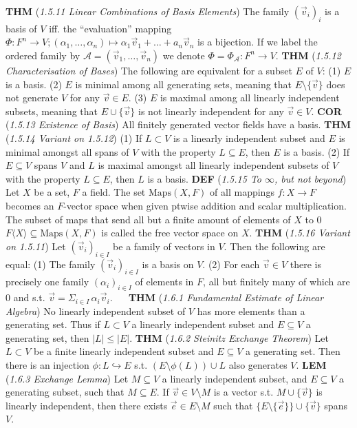 \documentclass{article}
\newcommand{\wde}[1]{\textcolor{defc}{\textbf{DEF}} (\textcolor{namec}{\textit{#1}})}
\newcommand{\wl}[1]{\textcolor{lemc}{\textbf{LEM}} (\textcolor{namec}{\textit{#1}})}
\newcommand{\wc}[1]{\textcolor{corc}{\textbf{COR}} (\textcolor{namec}{\textit{#1}})}
\newcommand{\wt}[1]{\textcolor{thmc}{\textbf{THM}} (\textcolor{namec}{\textit{#1}})}
\newcommand{\Maps}[0]{\text{Maps}}
\begin{document}
\begin{multicols}{2}
  \wt{1.5.11 Linear Combinations of Basis Elements} The family $(\vec{v}_{i})_{i}$ is a basis of $V$ iff. the ``evaluation'' mapping $\Phi : F^{n} \to V; (\alpha_{1}, \dots, \alpha_{n}) \mapsto \alpha_{1}\vec{v}_{1} + \dots + a_{n}\vec{v}_{n}$ is a bijection. If we label the ordered family by $\mathcal{A} = (\vec{v}_{1}, \dots, \vec{v}_{n})$ we denote $\Phi = \Phi_{\mathcal{A}} : F^{n} \to V$.
  \wt{1.5.12 Characterisation of Bases} The following are equivalent for a subset $E$ of $V$:
  (1) $E$ is a basis.
  (2) $E$ is minimal among all generating sets, meaning that $E \setminus \{\vec{v}\}$ does not generate $V$ for any $\vec{v} \in E$.
  (3) $E$ is maximal among all linearly independent subsets, meaning that $E \cup \{\vec{v}\}$ is not linearly independent for any $\vec{v} \in V$.
  \wc{1.5.13 Existence of Basis} All finitely generated vector fields have a basis.
  \wt{1.5.14 Variant on 1.5.12}
  (1) If $L \subset V$ is a linearly independent subset and $E$ is minimal amongst all spans of $V$ with the property $L \subseteq E$, then $E$ is a basis.
  (2) If $E \subseteq V$ spans $V$ and $L$ is maximal amongst all linearly independent subsets of $V$ with the property $L \subseteq E$, then $L$ is a basis.
  \wde{1.5.15 To $\infty$, but not beyond} Let $X$ be a set, $F$ a field. The set $\Maps(X,F)$ of all mappings $f : X \to F$ becomes an $F$-vector space when given ptwise addition and scalar multiplication. The subset of maps that send all but a finite amount of elements of $X$ to 0 $F \langle X \rangle \subseteq \Maps(X, F)$ is called the free vector space on $X$.
  \wt{1.5.16 Variant on 1.5.11} Let $(\vec{v}_{i})_{i \in I}$ be a family of vectors in $V$. Then the following are equal:
  (1) The family $(\vec{v}_{i})_{i \in I}$ is a basis on $V$.
  (2) For each $\vec{v} \in V$ there is precisely one family $(\alpha_{i})_{i \in I}$ of elements in $F$, all but finitely many of which are 0 and s.t. $\vec{v} = \Sigma_{i \in I} \, \alpha_{i}\vec{v}_{i}$.
\ \
  \wt{1.6.1 Fundamental Estimate of Linear Algebra} No linearly independent subset of $V$ has more elements than a generating set. Thus if $L \subset V$ a linearly independent subset and $E \subseteq V$ a generating set, then $|L| \le |E|$.
  \wt{1.6.2 Steinitz Exchange Theorem} Let $L \subset V$ be a finite linearly independent subset and $E \subseteq V$ a generating set. Then there is an injection $\phi : L \hookrightarrow E$ s.t. $(E \setminus \phi(L)) \cup L$ also generates $V$.
  \wl{1.6.3 Exchange Lemma} Let $M \subseteq V$ a linearly independent subset, and $E \subseteq V$ a generating subset, such that $M \subseteq E$. If $\vec{v} \in V \setminus M$ is a vector s.t. $M \cup \{\vec{v}\}$ is linearly independent, then there exists $\vec{e} \in E \setminus M$ such that $\{E \setminus \{\vec{e}\}\} \cup \{\vec{v}\}$ spans $V$.

\end{multicols}
\end{document}

